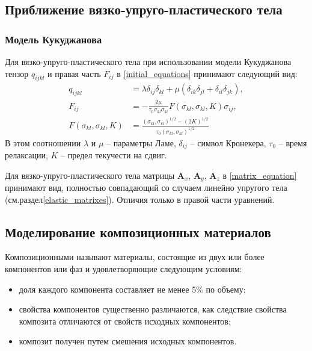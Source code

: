 \subsection{Приближение вязко-упруго-пластического тела}

\subsubsection{Модель Кукуджанова}
\label{kukudzhanov_matrixes}

Для вязко-упруго-пластического тела при использовании модели Кукуджанова тензор $q_{ijkl}$ и правая часть $F_{ij}$ в \ref{initial_equations} принимают следующий вид:
\begin{align}
\label{tensor_qijkl_kukudzhanov}
q_{ijkl}&=\lambda\delta_{ij}\delta_{kl}+\mu(\delta_{ik}\delta_{jl}+\delta_{il}
\delta_{jk}),\nonumber\\
F_{ij}&=-\frac{2\mu}{\tau_0\sigma_{kl}\sigma_{kl}} F(\sigma_{kl},\sigma_{kl},K)\sigma_{ij},\nonumber\\
F(\sigma_{kl},\sigma_{kl},K) &= \frac{(\sigma_{kl},\sigma_{kl})^{1/2}-(2K)^{1/2}}{\tau_0(\sigma_{kl},\sigma_{kl})^{1/2}}
\end{align}
В этом соотношении $\lambda$ и $\mu$ -- параметры Ламе, $\delta_{ij}$ -- символ Кронекера, $\tau_0$ -- время релаксации, $K$ -- предел текучести на сдвиг.

Для вязко-упруго-пластического тела матрицы $\mathbf{A}_x$, $\mathbf{A}_y$, $\mathbf{A}_z$ в \ref{matrix_equation} принимают вид, полностью совпадающий со случаем линейно упругого тела (см.раздел\ref{elastic_matrixes}). Отличия только в правой части уравнений.


\clearpage
\newpage

\subsection{Моделирование композиционных материалов}

Композиционными называют материалы, состоящие из двух или более компонентов или фаз и удовлетворяющие следующим условиям:
\begin{itemize}
\item доля каждого компонента составляет не менее 5\% по объему;
\item свойства компонентов существенно различаются, как следствие свойства композита отличаются от свойств исходных компонентов;
\item композит получен путем смешения исходных компонентов.
\end{itemize}

